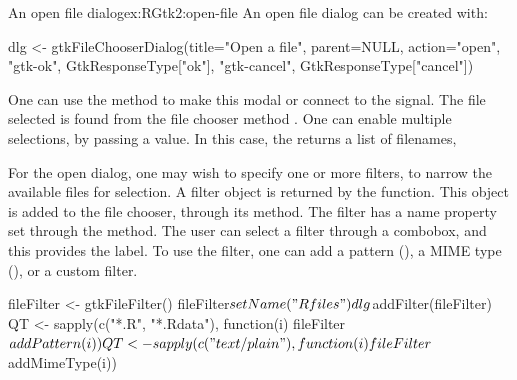 \begin{example}{An open file dialog}{ex:RGtk2:open-file}
An open file dialog can be created with:

\begin{Schunk}
\begin{Sinput}
 dlg <- gtkFileChooserDialog(title="Open a file", parent=NULL, action="open",
                             "gtk-ok", GtkResponseType["ok"],
                             "gtk-cancel", GtkResponseType["cancel"])
\end{Sinput}
\end{Schunk}

One can use the  method to make this modal or connect to the
 signal. The file selected is found from the file
chooser method . One can enable
multiple selections, by passing
 a  value. In
this case, the  returns a list of filenames,

\begin{Schunk}
\end{Schunk}

For the open dialog, one may wish to specify one or more filters, to narrow the
available files for selection. A filter object is returned by the
 function.
This object is added to the file chooser, through its
 method. The filter has a name
property set through the  method. The
user can select a filter through a combobox, and this provides the
label. To use
the filter, one can add a pattern (),
a MIME type (), or a custom filter. 

\begin{Schunk}
\begin{Sinput}
 fileFilter <- gtkFileFilter()
 fileFilter$setName("R files")
 dlg$addFilter(fileFilter)
 QT <- sapply(c("*.R", "*.Rdata"), 
              function(i) fileFilter$addPattern(i))
 QT <- sapply(c("text/plain"), 
              function(i) fileFilter$addMimeType(i))
\end{Sinput}
\end{Schunk}
\end{example}

